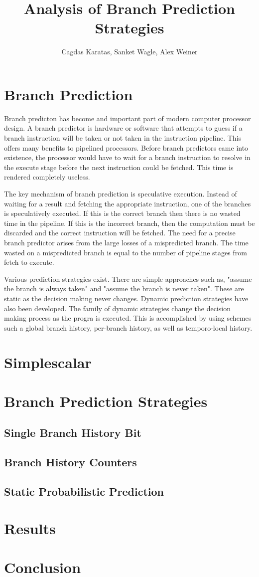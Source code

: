 \documentclass[a4paper,12pt]{article}
\begin{document}
\author{Cagdas Karatas, Sanket Wagle, Alex Weiner}
\title{Analysis of Branch Prediction Strategies}
\maketitle

\section{Branch Prediction}
Branch predicton has become and important part of modern computer processor design. A branch predictor is hardware or software that attempts to guess if a branch instruction will be taken or not taken in the instruction pipeline. This offers many benefits to pipelined processors. Before branch predictors came into existence, the processor would have to wait for a branch instruction to resolve in the execute stage before the next instruction could be fetched. This time is rendered completely useless. 

The key mechanism of branch prediction is speculative execution. Instead of waiting for a result and fetching the appropriate instruction, one of the branches is speculatively executed. If this is the correct branch then there is no wasted time in the pipeline. If this is the incorrect branch, then the computation must be discarded and the correct instruction will be fetched. The need for a precise branch predictor arises from the large losses of a mispredicted branch. The time wasted on a mispredicted branch is equal to the number of pipeline stages from fetch to execute.

Various prediction strategies exist. There are simple approaches such as, "assume the branch is always taken" and "assume the branch is never taken". These are static as the decision making never changes. Dynamic prediction strategies have also been developed. The family of dynamic strategies change the decision making process as the progra is executed. This is accomplished by using schemes such a global branch history, per-branch history, as well as temporo-local history.

\section{Simplescalar}
\section{Branch Prediction Strategies}
\subsection{Single Branch History Bit}
\subsection{Branch History Counters}
\subsection{Static Probabilistic Prediction}
\section{Results}
\section{Conclusion}
\end{document}

